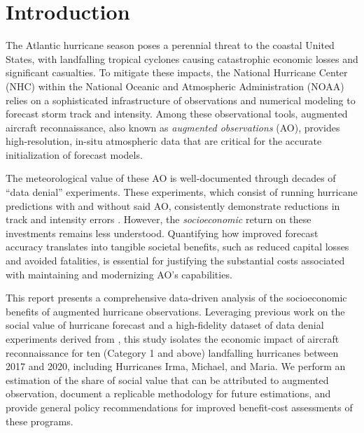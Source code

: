 \documentclass[12pt]{article}%
\begin{document}
 \FloatBarrier
\section{Introduction} \label{sec:intro}

The Atlantic hurricane season poses a perennial threat to the coastal United States, with landfalling tropical cyclones causing catastrophic economic losses and significant casualties. To mitigate these impacts, the National Hurricane Center (NHC)  within  the National Oceanic and Atmospheric Administration (NOAA)  relies on a sophisticated infrastructure of observations and numerical modeling to forecast storm track and intensity. Among these observational tools, augmented aircraft reconnaissance, also known as \emph{augmented observations} (AO), provides high-resolution, in-situ atmospheric data that are critical for the accurate initialization of forecast models.

The meteorological value of these AO is well-documented through decades of ``data denial'' experiments. These experiments, which consist of running hurricane predictions with and without said AO, consistently demonstrate reductions in track and intensity errors \citep{Majumdar2016}. However, the \emph{socioeconomic} return on these investments remains less understood. Quantifying how improved forecast accuracy translates into tangible societal benefits, such as reduced capital losses and avoided fatalities, is essential for justifying the substantial costs associated with maintaining and modernizing AO's capabilities.

This report presents a comprehensive data-driven analysis of the socioeconomic benefits of augmented hurricane observations. Leveraging previous work on the social value of hurricane forecast \citep{molina2024social} and a high-fidelity dataset of data denial experiments derived from \citet{DitchekEA2023}, this study isolates the economic impact of aircraft reconnaissance for ten (Category 1 and above) landfalling hurricanes between 2017 and 2020, including Hurricanes Irma, Michael, and Maria. We perform an estimation of the share of social value that can be attributed to augmented observation, document a replicable methodology for future estimations, and provide general policy recommendations for improved  benefit-cost assessments of these programs.
\end{document}
